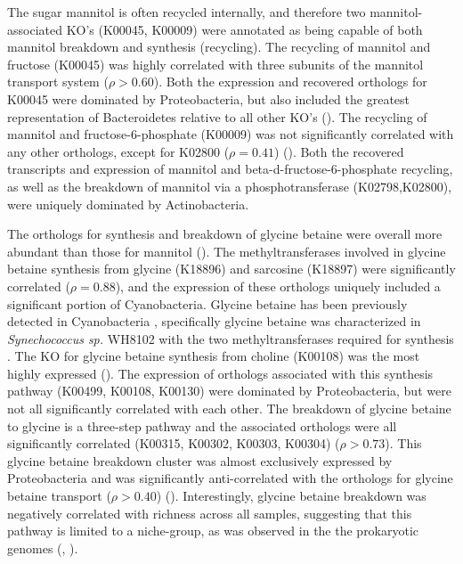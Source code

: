 \documentclass[utf8]{frontiersSCNS} %
\begin{document}
The sugar mannitol is often recycled internally, and therefore two mannitol-associated KO's (K00045, K00009) were annotated as being capable of both mannitol breakdown and synthesis (recycling). The recycling of mannitol and fructose (K00045) was highly correlated with three subunits of the mannitol transport system ($\rho > 0.60$). Both the expression and recovered orthologs for K00045 were dominated by Proteobacteria, but also included the greatest representation of Bacteroidetes relative to all other KO's (). The recycling of mannitol and fructose-6-phosphate (K00009) was not significantly correlated with any other orthologs, except for K02800 ($\rho = 0.41$) (). Both the recovered transcripts and expression of mannitol and beta-d-fructose-6-phosphate recycling, as well as the breakdown of mannitol via a phosphotransferase (K02798,K02800), were uniquely dominated by Actinobacteria.

The orthologs for synthesis and breakdown of glycine betaine were overall more abundant than those for mannitol (). The methyltransferases involved in glycine betaine synthesis from glycine (K18896) and sarcosine (K18897) were significantly correlated ($\rho=0.88$), and the expression of these orthologs uniquely included a significant portion of Cyanobacteria. Glycine betaine has been previously detected in Cyanobacteria \citep{Fiore2015,Heal2020.12.22.424086}, specifically glycine betaine was characterized in \emph{Synechococcus sp.} WH8102 with the two methyltransferases required for synthesis \citep{Lu2006}. The KO for glycine betaine synthesis from choline (K00108) was the most highly expressed (). The expression of orthologs associated with this synthesis pathway (K00499, K00108, K00130) were dominated by Proteobacteria, but were not all significantly correlated with each other. The breakdown of glycine betaine to glycine is a three-step pathway and the associated orthologs were all significantly correlated (K00315, K00302, K00303, K00304) ($\rho > 0.73$). This glycine betaine breakdown cluster was almost exclusively expressed by Proteobacteria and was significantly anti-correlated with the orthologs for glycine betaine transport ($\rho > 0.40$) (). Interestingly, glycine betaine breakdown was negatively correlated with richness across all samples, suggesting that this pathway is limited to a niche-group, as was observed in the the prokaryotic genomes (, ).
\end{document}

